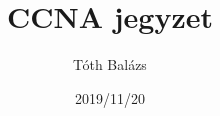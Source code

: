 \documentclass[a4paper]{report}
\title{CCNA jegyzet}
\author{Tóth Balázs}
\date{2019/11/20}
\begin{document}
   \maketitle
   \tableofcontents
   \pagebreak

   
   
   
\end{document}
